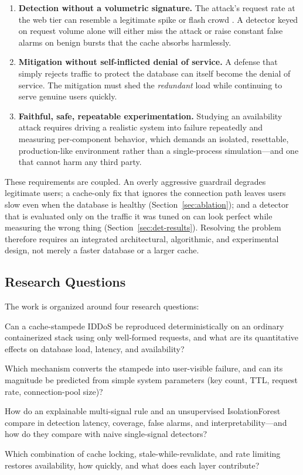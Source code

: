 \begin{enumerate}[label=\textbf{T\arabic*.},leftmargin=*]
\item \textbf{Detection without a volumetric signature.} The attack's request rate at
the web tier can resemble a legitimate spike or flash crowd \cite{jung2002,kandula2005}.
A detector keyed on request volume alone will either miss the attack or raise
constant false alarms on benign bursts that the cache absorbs harmlessly.
\item \textbf{Mitigation without self-inflicted denial of service.} A defense that
simply rejects traffic to protect the database can itself become the denial of
service. The mitigation must shed the \emph{redundant} load while continuing to serve
genuine users quickly.
\item \textbf{Faithful, safe, repeatable experimentation.} Studying an availability
attack requires driving a realistic system into failure repeatedly and measuring
per-component behavior, which demands an isolated, resettable, production-like
environment rather than a single-process simulation---and one that cannot harm any
third party.
\end{enumerate}

These requirements are coupled. An overly aggressive guardrail degrades legitimate
users; a cache-only fix that ignores the connection path leaves users slow even when
the database is healthy (Section~\ref{sec:ablation}); and a detector that is evaluated
only on the traffic it was tuned on can look perfect while measuring the wrong thing
(Section~\ref{sec:det-results}). Resolving the problem therefore requires an integrated
architectural, algorithmic, and experimental design, not merely a faster database or a
larger cache.

\subsection{Research Questions}
The work is organized around four research questions:
\begin{description}[leftmargin=1.2em,style=nextline]
\item[RQ1 (Reproduction).] Can a cache-stampede IDDoS be reproduced deterministically
on an ordinary containerized stack using only well-formed requests, and what are its
quantitative effects on database load, latency, and availability?
\item[RQ2 (Mechanism).] Which mechanism converts the stampede into user-visible failure,
and can its magnitude be predicted from simple system parameters (key count, TTL,
request rate, connection-pool size)?
\item[RQ3 (Detection).] How do an explainable multi-signal rule and an unsupervised
IsolationForest compare in detection latency, coverage, false alarms, and
interpretability---and how do they compare with naive single-signal detectors?
\item[RQ4 (Mitigation).] Which combination of cache locking, stale-while-revalidate,
and rate limiting restores availability, how quickly, and what does each layer
contribute?
\end{description}

